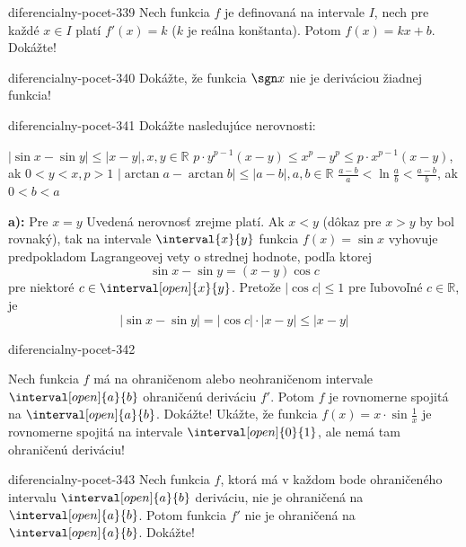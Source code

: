 \begin{defproblem}{diferencialny-pocet-339}
Nech funkcia $f$ je definovaná na intervale $I$, nech pre každé $x\in I$ platí
$f'(x)=k$ ($k$ je reálna konštanta). Potom $f(x)=kx+b$. Dokážte!
\end{defproblem}

\begin{defproblem}{diferencialny-pocet-340}
Dokážte, že funkcia $\sgn x$ nie je deriváciou žiadnej funkcia!
\end{defproblem}

\begin{defproblem}{diferencialny-pocet-341}
Dokážte nasledujúce nerovnosti:
\begin{tasks}
\task $|\sin x-\sin y|\leq |x-y|,x,y\in\mathbb{R}$
\task $p\cdot y^{p-1}(x-y)\leq x^p-y^p \leq p\cdot x^{p-1}(x-y)$, ak $0<y<x,p>1$
\task $|\arctan a-\arctan b|\leq |a-b|,a,b\in\mathbb{R}$
\task $\frac{a-b}{a}<\ln \frac{a}{b}<\frac{a-b}{b}$, ak $0<b<a$
\end{tasks}

\begin{solution}
  \textbf{a):}
  Pre $x=y$ Uvedená nerovnosť zrejme platí. Ak $x<y$ (dôkaz pre $x>y$ by bol
  rovnaký), tak na intervale $\interval{x}{y}$ funkcia $f(x)=\sin x$ vyhovuje
  predpokladom Lagrangeovej vety o strednej hodnote, podľa ktorej
  \[
    \sin x - \sin y = (x-y) \cos c
  \]
  pre niektoré $c\in \interval[open]{x}{y}$. Pretože $|\cos c|\leq 1$ pre
  ľubovoľné $c\in\mathbb{R}$, je
  \[
    |\sin x-\sin y|=|\cos c|\cdot|x-y|\leq |x-y|
  \]
\end{solution}
\end{defproblem}

\begin{defproblem}{diferencialny-pocet-342}
\begin{tasks}
\task
  Nech funkcia $f$ má na ohraničenom alebo neohraničenom intervale
  $\interval[open]{a}{b}$ ohraničenú deriváciu $f'$. Potom $f$ je rovnomerne
  spojitá na $\interval[open]{a}{b}$. Dokážte!
\task
  Ukážte, že funkcia $f(x)=x\cdot \sin \frac{1}{x}$ je rovnomerne spojitá na
  intervale $\interval[open]{0}{1}$, ale nemá tam ohraničenú deriváciu!
\end{tasks}
\end{defproblem}

\begin{defproblem}{diferencialny-pocet-343}
Nech funkcia $f$, ktorá má v každom bode ohraničeného intervalu
$\interval[open]{a}{b}$ deriváciu, nie je ohraničená na $\interval[open]{a}{b}$.
Potom funkcia $f'$ nie je ohraničená na $\interval[open]{a}{b}$. Dokážte!
\end{defproblem}

